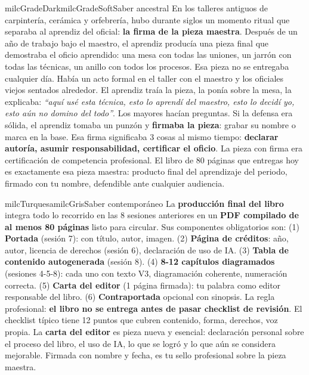 \documentclass[11pt,letterpaper]{article}
\begin{document}
\begin{softbox}{milcGradeDark}{milcGradeSoft}{Saber ancestral}
En los talleres antiguos de carpintería, cerámica y orfebrería, hubo durante siglos un momento ritual que separaba al aprendiz del oficial: \textbf{la firma de la pieza maestra}. Después de un año de trabajo bajo el maestro, el aprendiz producía una pieza final que demostraba el oficio aprendido: una mesa con todas las uniones, un jarrón con todas las técnicas, un anillo con todos los procesos. Esa pieza no se entregaba cualquier día. Había un acto formal en el taller con el maestro y los oficiales viejos sentados alrededor. El aprendiz traía la pieza, la ponía sobre la mesa, la explicaba: \emph{``aquí usé esta técnica, esto lo aprendí del maestro, esto lo decidí yo, esto aún no domino del todo''}. Los mayores hacían preguntas. Si la defensa era sólida, el aprendiz tomaba un punzón y \textbf{firmaba la pieza}: grabar su nombre o marca en la base. Esa firma significaba 3 cosas al mismo tiempo: \textbf{declarar autoría, asumir responsabilidad, certificar el oficio}. La pieza con firma era certificación de competencia profesional. El libro de 80 páginas que entregas hoy es exactamente esa pieza maestra: producto final del aprendizaje del periodo, firmado con tu nombre, defendible ante cualquier audiencia.
\end{softbox}

\begin{softbox}{milcTurquesa}{milcGris}{Saber contemporáneo}
La \textbf{producción final del libro} integra todo lo recorrido en las 8 sesiones anteriores en un \textbf{PDF compilado de al menos 80 páginas} listo para circular. Sus componentes obligatorios son: (1) \textbf{Portada} (sesión 7): con título, autor, imagen. (2) \textbf{Página de créditos}: año, autor, licencia de derechos (sesión 6), declaración de uso de IA. (3) \textbf{Tabla de contenido autogenerada} (sesión 8). (4) \textbf{8-12 capítulos diagramados} (sesiones 4-5-8): cada uno con texto V3, diagramación coherente, numeración correcta. (5) \textbf{Carta del editor} (1 página firmada): tu palabra como editor responsable del libro. (6) \textbf{Contraportada} opcional con sinopsis. La regla profesional: \textbf{el libro no se entrega antes de pasar checklist de revisión}. El checklist típico tiene 12 puntos que cubren contenido, forma, derechos, voz propia. La \textbf{carta del editor} es pieza nueva y esencial: declaración personal sobre el proceso del libro, el uso de IA, lo que se logró y lo que aún se considera mejorable. Firmada con nombre y fecha, es tu sello profesional sobre la pieza maestra.
\end{softbox}
\end{document}
